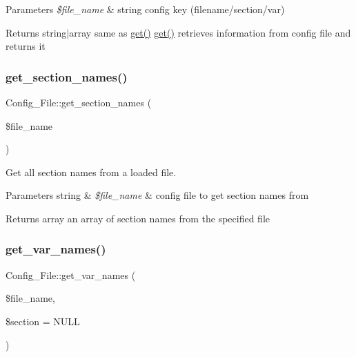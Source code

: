 \begin{DoxyParams}{Parameters}
{\em \$file\+\_\+name} & string config key (filename/section/var) \\
\hline
\end{DoxyParams}
\begin{DoxyReturn}{Returns}
string$\vert$array same as \mbox{\hyperlink{class_config___file_adfcb0335a75e1e8d12e54d6bbe029bd6}{get()}}  \mbox{\hyperlink{class_config___file_adfcb0335a75e1e8d12e54d6bbe029bd6}{get()}} retrieves information from config file and returns it 
\end{DoxyReturn}
\mbox{\label{class_config___file_a7d3d15a298e32cbe68ff0cbe90c5d842}} 
\subsubsection{\texorpdfstring{get\+\_\+section\+\_\+names()}{get\_section\_names()}}
{\footnotesize\ttfamily Config\+\_\+\+File\+::get\+\_\+section\+\_\+names (\begin{DoxyParamCaption}\item[{}]{\$file\+\_\+name }\end{DoxyParamCaption})}

Get all section names from a loaded file.


\begin{DoxyParams}[1]{Parameters}
string & {\em \$file\+\_\+name} & config file to get section names from \\
\hline
\end{DoxyParams}
\begin{DoxyReturn}{Returns}
array an array of section names from the specified file 
\end{DoxyReturn}
\mbox{\label{class_config___file_a49d583892786bedbaefb72354bfeefb7}} 
\subsubsection{\texorpdfstring{get\+\_\+var\+\_\+names()}{get\_var\_names()}}
{\footnotesize\ttfamily Config\+\_\+\+File\+::get\+\_\+var\+\_\+names (\begin{DoxyParamCaption}\item[{}]{\$file\+\_\+name,  }\item[{}]{\$section = {\ttfamily NULL} }\end{DoxyParamCaption})}


